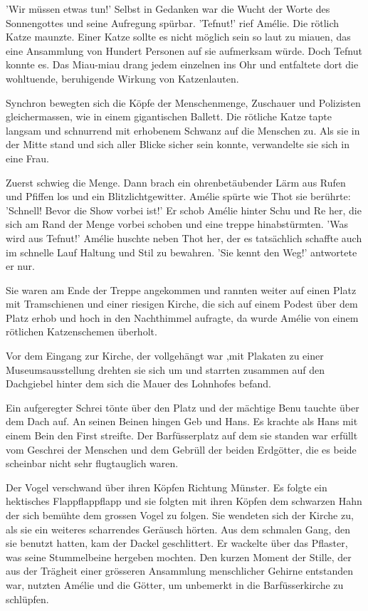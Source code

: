 \documentclass[11pt,titlepage,a5paper]{book}
\begin{document}
'Wir müssen etwas tun!' Selbst in Gedanken war die Wucht der Worte des Sonnengottes und seine Aufregung spürbar. 'Tefnut!' rief Amélie. Die rötlich Katze maunzte. Einer Katze sollte es nicht möglich sein so laut zu miauen, das eine Ansammlung von Hundert Personen auf sie aufmerksam würde. Doch Tefnut konnte es. Das Miau-miau drang jedem einzelnen ins Ohr und entfaltete dort die wohltuende, beruhigende Wirkung von Katzenlauten.

Synchron bewegten sich die Köpfe der Menschenmenge, Zuschauer und Polizisten gleichermassen, wie in einem gigantischen Ballett. Die rötliche Katze tapte langsam und schnurrend mit erhobenem Schwanz auf die Menschen zu. Als sie in der Mitte stand und sich aller Blicke sicher sein konnte, verwandelte sie sich in eine Frau.

Zuerst schwieg die Menge. Dann brach ein ohrenbetäubender Lärm aus Rufen und Pfiffen los und ein Blitzlichtgewitter. Amélie spürte wie Thot sie berührte: 'Schnell! Bevor die Show vorbei ist!' Er schob Amélie hinter Schu und Re her, die sich am Rand der Menge vorbei schoben und eine treppe hinabstürmten. 'Was wird aus Tefnut!' Amélie huschte neben Thot her, der es tatsächlich schaffte auch im schnelle Lauf Haltung und Stil zu bewahren. 'Sie kennt den Weg!' antwortete er nur.

Sie waren am Ende der Treppe angekommen und rannten weiter auf einen Platz mit Tramschienen und einer riesigen Kirche, die sich auf einem Podest über dem Platz erhob und hoch in den Nachthimmel aufragte, da wurde Amélie von einem rötlichen Katzenschemen überholt.

Vor dem Eingang zur Kirche, der vollgehängt war ,mit Plakaten zu einer Museumsausstellung drehten sie sich um und starrten zusammen auf den Dachgiebel hinter dem sich die Mauer des Lohnhofes befand.

Ein aufgeregter Schrei tönte über den Platz und der mächtige Benu tauchte über dem Dach auf. An seinen Beinen hingen Geb und Hans. Es krachte als Hans mit einem Bein den First streifte. Der Barfüsserplatz auf dem sie standen war erfüllt vom Geschrei der Menschen und dem Gebrüll der beiden Erdgötter, die es beide scheinbar nicht sehr flugtauglich waren. 

Der Vogel verschwand über ihren Köpfen Richtung Münster. Es folgte ein hektisches Flappflappflapp und sie folgten mit ihren Köpfen dem schwarzen Hahn der sich bemühte dem grossen Vogel zu folgen. Sie wendeten sich der Kirche zu, als sie ein weiteres scharrendes Geräusch hörten. Aus dem schmalen Gang, den sie benutzt hatten, kam der Dackel geschlittert. Er wackelte über das Pflaster, was seine Stummelbeine hergeben mochten. Den kurzen Moment der Stille, der aus der Trägheit einer grösseren Ansammlung menschlicher Gehirne entstanden war, nutzten Amélie und die Götter, um unbemerkt in die Barfüsserkirche zu schlüpfen.
\end{document}
